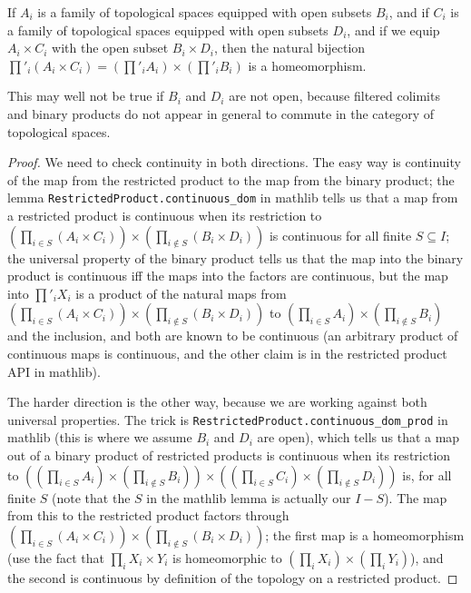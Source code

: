 \begin{lemma} If $A_i$ is a family of topological spaces equipped with open
  subsets $B_i$, and if $C_i$ is a family of topological spaces equipped
  with open subsets $D_i$, and if we equip $A_i\times C_i$ with the open
  subset $B_i\times D_i$, then the natural bijection
  $\prod'_i(A_i\times C_i)=\left(\prod'_iA_i\right)\times\left(\prod'_iB_i\right)$
  is a homeomorphism.
\end{lemma}
\begin{remark} This may well not be true if $B_i$ and $D_i$ are not open, because
  filtered colimits and binary products do not appear in general to commute
  in the category of topological spaces.
\end{remark}
\begin{proof} We need to check continuity in both directions. The easy way is
  continuity of the map from the restricted product to the map from the binary
  product; the lemma {\tt RestrictedProduct.continuous\_dom} in mathlib
  tells us that a map from a restricted product is continuous when its restriction
  to $\left(\prod_{i\in S}(A_i\times C_i)\right)\times\left(\prod_{i\notin S}(B_i\times D_i)\right)$
  is continuous for all finite $S\subseteq I$; the universal property of the binary
  product tells us that the map into the binary product is continuous iff the maps into
  the factors are continuous, but the map into $\prod'_iX_i$ is a product of the
  natural maps from $\left(\prod_{i\in S}(A_i\times C_i)\right)\times\left(\prod_{i\notin S}(B_i\times D_i)\right)$
  to $\left(\prod_{i\in S}A_i\right)\times\left(\prod_{i\notin S}B_i\right)$
  and the inclusion, and both are known to be continuous (an arbitrary product of continuous
  maps is continuous, and the other claim is in the restricted product API in mathlib).

  The harder direction is the other way, because we are working against both universal
  properties. The trick is {\tt RestrictedProduct.continuous\_dom\_prod} in mathlib
  (this is where we assume $B_i$ and $D_i$ are open), which tells us that a map out of
  a binary product of restricted products is continuous when its restriction to
  $\left(\left(\prod_{i\in S}A_i\right)\times\left(\prod_{i\notin S}B_i\right)\right)\times
  \left(\left(\prod_{i\in S}C_i\right)\times\left(\prod_{i\notin S}D_i\right)\right)$
  is, for all finite $S$ (note that the $S$ in the mathlib lemma is actually our $I-S$).
  The map from this to the restricted product factors through
  $\left(\prod_{i\in S}(A_i\times C_i)\right)\times\left(\prod_{i\notin S}(B_i\times D_i)\right)$;
  the first map is a homeomorphism (use the fact that $\prod_iX_i\times Y_i$ is homeomorphic
  to $\left(\prod_iX_i\right)\times\left(\prod_iY_i\right)$), and the second is continuous
  by definition of the topology on a restricted product.
\end{proof}

